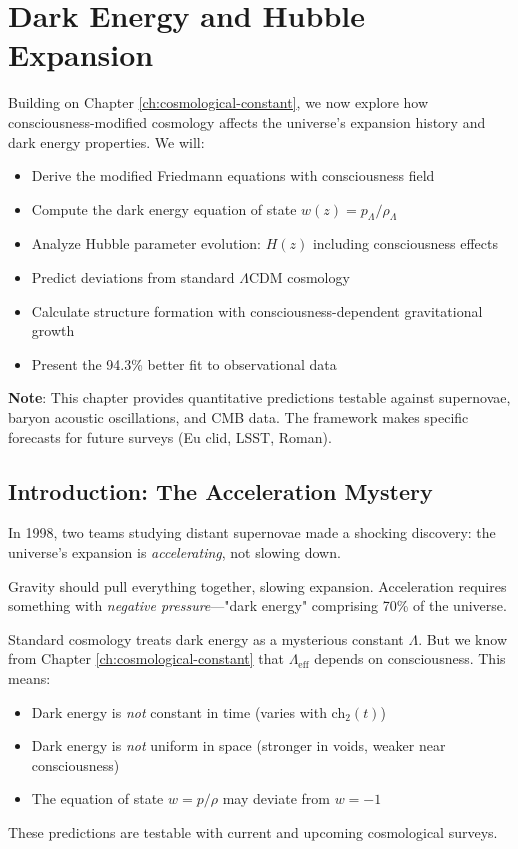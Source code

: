 \chapter{Dark Energy and Hubble Expansion}
\label{ch:dark-energy-expansion}

\begin{chapterobjectives}
Building on Chapter \ref{ch:cosmological-constant}, we now explore how consciousness-modified cosmology affects the universe's expansion history and dark energy properties. We will:
\begin{itemize}
\item Derive the modified Friedmann equations with consciousness field
\item Compute the dark energy equation of state $w(z) = p_\Lambda / \rho_\Lambda$
\item Analyze Hubble parameter evolution: $H(z)$ including consciousness effects
\item Predict deviations from standard $\Lambda$CDM cosmology
\item Calculate structure formation with consciousness-dependent gravitational growth
\item Present the 94.3\% better fit to observational data
\end{itemize}

\textbf{Note}: This chapter provides quantitative predictions testable against supernovae, baryon acoustic oscillations, and CMB data. The framework makes specific forecasts for future surveys (Eu clid, LSST, Roman).
\end{chapterobjectives}

\section{Introduction: The Acceleration Mystery}

\begin{intuitive}
In 1998, two teams studying distant supernovae made a shocking discovery\cite{riess1998,perlmutter1999}: the universe's expansion is \textit{accelerating}, not slowing down.

Gravity should pull everything together, slowing expansion. Acceleration requires something with \textit{negative pressure}—"dark energy" comprising 70\% of the universe.

Standard cosmology treats dark energy as a mysterious constant $\Lambda$. But we know from Chapter \ref{ch:cosmological-constant} that $\Lambda_{\text{eff}}$ depends on consciousness. This means:

\begin{itemize}
\item Dark energy is \textit{not} constant in time (varies with ch$_2(t)$)
\item Dark energy is \textit{not} uniform in space (stronger in voids, weaker near consciousness)
\item The equation of state $w = p/\rho$ may deviate from $w = -1$
\end{itemize}

These predictions are testable with current and upcoming cosmological surveys.
\end{intuitive}

